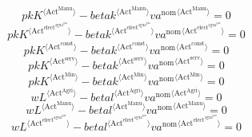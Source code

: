 \begin{equation}
{{p\!k}} {{K}^{\langle \mathrm{Act}^{\mathrm{Manu}}\rangle}} - {{{b\!e\!t\!a\!k}}^{\langle \mathrm{\mathrm{Act}^{\mathrm{Manu}}}\rangle}} {{{v\!a}^{\mathrm{nom}}}^{\langle \mathrm{Act}^{\mathrm{Manu}}\rangle}} = 0
\end{equation}
\begin{equation}
{{p\!k}} {{K}^{\langle \mathrm{Act}^{\mathrm{elect}^{\mathrm{agua}^{\mathrm{gas}}}}\rangle}} - {{{b\!e\!t\!a\!k}}^{\langle \mathrm{\mathrm{Act}^{\mathrm{elect}^{\mathrm{agua}^{\mathrm{gas}}}}}\rangle}} {{{v\!a}^{\mathrm{nom}}}^{\langle \mathrm{Act}^{\mathrm{elect}^{\mathrm{agua}^{\mathrm{gas}}}}\rangle}} = 0
\end{equation}
\begin{equation}
{{p\!k}} {{K}^{\langle \mathrm{Act}^{\mathrm{const}}\rangle}} - {{{b\!e\!t\!a\!k}}^{\langle \mathrm{\mathrm{Act}^{\mathrm{const}}}\rangle}} {{{v\!a}^{\mathrm{nom}}}^{\langle \mathrm{Act}^{\mathrm{const}}\rangle}} = 0
\end{equation}
\begin{equation}
{{p\!k}} {{K}^{\langle \mathrm{Act}^{\mathrm{serv}}\rangle}} - {{{b\!e\!t\!a\!k}}^{\langle \mathrm{\mathrm{Act}^{\mathrm{serv}}}\rangle}} {{{v\!a}^{\mathrm{nom}}}^{\langle \mathrm{Act}^{\mathrm{serv}}\rangle}} = 0
\end{equation}
\begin{equation}
{{p\!k}} {{K}^{\langle \mathrm{Act}^{\mathrm{Min}}\rangle}} - {{{b\!e\!t\!a\!k}}^{\langle \mathrm{\mathrm{Act}^{\mathrm{Min}}}\rangle}} {{{v\!a}^{\mathrm{nom}}}^{\langle \mathrm{Act}^{\mathrm{Min}}\rangle}} = 0
\end{equation}
\begin{equation}
{w} {{L}^{\langle \mathrm{Act}^{\mathrm{Agri}}\rangle}} - {{{b\!e\!t\!a\!l}}^{\langle \mathrm{\mathrm{Act}^{\mathrm{Agri}}}\rangle}} {{{v\!a}^{\mathrm{nom}}}^{\langle \mathrm{Act}^{\mathrm{Agri}}\rangle}} = 0
\end{equation}
\begin{equation}
{w} {{L}^{\langle \mathrm{Act}^{\mathrm{Manu}}\rangle}} - {{{b\!e\!t\!a\!l}}^{\langle \mathrm{\mathrm{Act}^{\mathrm{Manu}}}\rangle}} {{{v\!a}^{\mathrm{nom}}}^{\langle \mathrm{Act}^{\mathrm{Manu}}\rangle}} = 0
\end{equation}
\begin{equation}
{w} {{L}^{\langle \mathrm{Act}^{\mathrm{elect}^{\mathrm{agua}^{\mathrm{gas}}}}\rangle}} - {{{b\!e\!t\!a\!l}}^{\langle \mathrm{\mathrm{Act}^{\mathrm{elect}^{\mathrm{agua}^{\mathrm{gas}}}}}\rangle}} {{{v\!a}^{\mathrm{nom}}}^{\langle \mathrm{Act}^{\mathrm{elect}^{\mathrm{agua}^{\mathrm{gas}}}}\rangle}} = 0
\end{equation}
